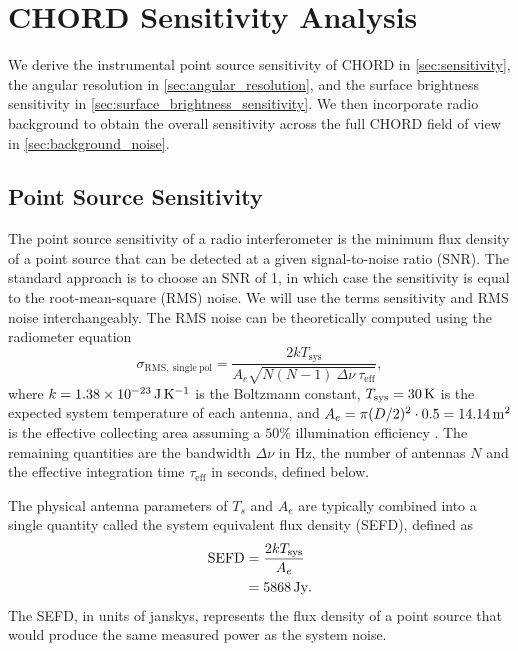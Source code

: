 \chapter{CHORD Sensitivity Analysis}
\label{ch:sensitivity_analysis}
We derive the instrumental point source sensitivity of CHORD in \autoref{sec:sensitivity}, the angular resolution in \autoref{sec:angular_resolution}, and the surface brightness sensitivity in \autoref{sec:surface_brightness_sensitivity}. We then incorporate radio background to obtain the overall sensitivity across the full CHORD field of view in \autoref{sec:background_noise}.

\section{Point Source Sensitivity}
\label{sec:sensitivity}
The point source sensitivity of a radio interferometer is the minimum flux density of a point source that can be detected at a given signal-to-noise ratio (SNR). The standard approach is to choose an SNR of 1, in which case the sensitivity is equal to the root-mean-square (RMS) noise. We will use the terms sensitivity and RMS noise interchangeably. The RMS noise can be theoretically computed using the radiometer equation \cite{condonEssentialRadioAstronomy2016}
\begin{equation}
    \sigma_{\mathrm{RMS}, ~\mathrm{single~pol}}
    = \frac{2kT_\mathrm{sys}}{A_e\sqrt{N(N-1)~\Delta \nu ~\tau_{\mathrm{eff}}}},
    \label{eq:radiometer_noise_rms}
\end{equation}
where \(k=1.38\times 10^{-23} \,\mathrm{J} \, \mathrm{K}^{-1}\) is the Boltzmann constant, \( T_\mathrm{sys} = 30\, \mathrm{K}\) is the expected system temperature of each antenna, and \( A_e = \pi(D/2)^2\cdot0.5=14.14 \, \mathrm{m}^2\) is the effective collecting area assuming a \(50\%\) illumination efficiency \cite{SPIEpaper}. The remaining quantities are the bandwidth \(\Delta \nu\) in Hz, the number of antennas \(N\) and the effective integration time \(\tau_{\mathrm{eff}}\) in seconds, defined below.

The physical antenna parameters of $T_s$ and $A_e$ are typically combined into a single quantity called the system equivalent flux density (SEFD), defined as
\begin{align}
    \mathrm{SEFD} &= \frac{2kT_\mathrm{sys}}{A_e} \\
    &= 5868 \, \mathrm{Jy}.
\end{align}
The SEFD, in units of janskys, represents the flux density of a point source that would produce the same measured power as the system noise.\\

